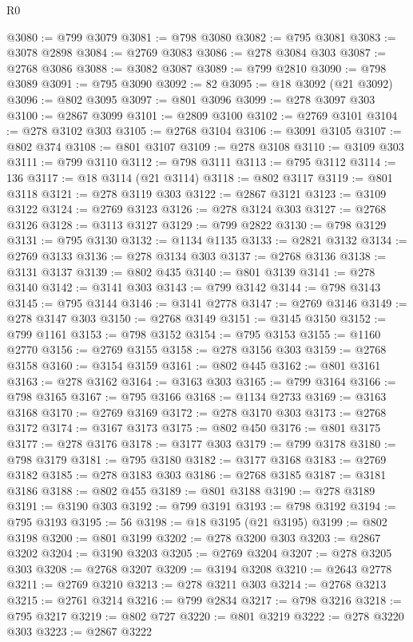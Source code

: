 \begin{lexlean}{R0}
\begin{coremodule}
@3080 := @799 @3079
@3081 := @798 @3080
@3082 := @795 @3081
@3083 := @3078 @2898
@3084 := @2769 @3083
@3086 := @278 @3084 @303
@3087 := @2768 @3086
@3088 := @3082 @3087
@3089 := @799 @2810
@3090 := @798 @3089
@3091 := @795 @3090
@3092 := 82
@3095 := @18 @3092 (@21 @3092)
@3096 := @802 @3095
@3097 := @801 @3096
@3099 := @278 @3097 @303
@3100 := @2867 @3099
@3101 := @2809 @3100
@3102 := @2769 @3101
@3104 := @278 @3102 @303
@3105 := @2768 @3104
@3106 := @3091 @3105
@3107 := @802 @374
@3108 := @801 @3107
@3109 := @278 @3108
@3110 := @3109 @303
@3111 := @799 @3110
@3112 := @798 @3111
@3113 := @795 @3112
@3114 := 136
@3117 := @18 @3114 (@21 @3114)
@3118 := @802 @3117
@3119 := @801 @3118
@3121 := @278 @3119 @303
@3122 := @2867 @3121
@3123 := @3109 @3122
@3124 := @2769 @3123
@3126 := @278 @3124 @303
@3127 := @2768 @3126
@3128 := @3113 @3127
@3129 := @799 @2822
@3130 := @798 @3129
@3131 := @795 @3130
@3132 := @1134 @1135
@3133 := @2821 @3132
@3134 := @2769 @3133
@3136 := @278 @3134 @303
@3137 := @2768 @3136
@3138 := @3131 @3137
@3139 := @802 @435
@3140 := @801 @3139
@3141 := @278 @3140
@3142 := @3141 @303
@3143 := @799 @3142
@3144 := @798 @3143
@3145 := @795 @3144
@3146 := @3141 @2778
@3147 := @2769 @3146
@3149 := @278 @3147 @303
@3150 := @2768 @3149
@3151 := @3145 @3150
@3152 := @799 @1161
@3153 := @798 @3152
@3154 := @795 @3153
@3155 := @1160 @2770
@3156 := @2769 @3155
@3158 := @278 @3156 @303
@3159 := @2768 @3158
@3160 := @3154 @3159
@3161 := @802 @445
@3162 := @801 @3161
@3163 := @278 @3162
@3164 := @3163 @303
@3165 := @799 @3164
@3166 := @798 @3165
@3167 := @795 @3166
@3168 := @1134 @2733
@3169 := @3163 @3168
@3170 := @2769 @3169
@3172 := @278 @3170 @303
@3173 := @2768 @3172
@3174 := @3167 @3173
@3175 := @802 @450
@3176 := @801 @3175
@3177 := @278 @3176
@3178 := @3177 @303
@3179 := @799 @3178
@3180 := @798 @3179
@3181 := @795 @3180
@3182 := @3177 @3168
@3183 := @2769 @3182
@3185 := @278 @3183 @303
@3186 := @2768 @3185
@3187 := @3181 @3186
@3188 := @802 @455
@3189 := @801 @3188
@3190 := @278 @3189
@3191 := @3190 @303
@3192 := @799 @3191
@3193 := @798 @3192
@3194 := @795 @3193
@3195 := 56
@3198 := @18 @3195 (@21 @3195)
@3199 := @802 @3198
@3200 := @801 @3199
@3202 := @278 @3200 @303
@3203 := @2867 @3202
@3204 := @3190 @3203
@3205 := @2769 @3204
@3207 := @278 @3205 @303
@3208 := @2768 @3207
@3209 := @3194 @3208
@3210 := @2643 @2778
@3211 := @2769 @3210
@3213 := @278 @3211 @303
@3214 := @2768 @3213
@3215 := @2761 @3214
@3216 := @799 @2834
@3217 := @798 @3216
@3218 := @795 @3217
@3219 := @802 @727
@3220 := @801 @3219
@3222 := @278 @3220 @303
@3223 := @2867 @3222

\end{coremodule}
\end{lexlean}
